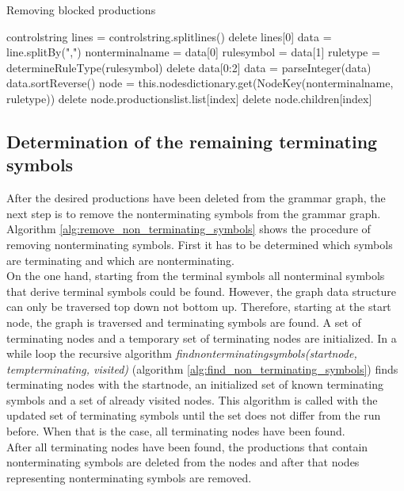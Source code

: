 \begin{algorithm}[H]
\caption{Removing blocked productions}
\begin{algorithmic}[1] 
\Require control\textunderscore string
\State lines = control\textunderscore string.splitlines()
\State delete lines[0]
	\State data = line.splitBy(",")
	\State nonterminal\textunderscore name = data[0] 
	\State rule\textunderscore symbol = data[1]
	\State rule\textunderscore type = determineRuleType(rule\textunderscore symbol)
	\State delete data[0:2]
	\State data = parseInteger(data)
	\State data.sortReverse()
	\State node = this.nodes\textunderscore dictionary.get(Node\textunderscore Key(nonterminal\textunderscore name, rule\textunderscore type))
		\State delete node.productions\textunderscore list.list[index]
		\State delete node.children[index]
	\EndFor
\EndFor
\end{algorithmic}
\label{alg:remove_blocked_productions}
\end{algorithm}

\subsection{Determination of the remaining terminating symbols}

After the desired productions have been deleted from the grammar graph, the next step is to remove the nonterminating symbols from the grammar graph. Algorithm \ref{alg:remove_non_terminating_symbols} shows the procedure of removing nonterminating symbols.
First it has to be determined which symbols are terminating and which are nonterminating. \\
On the one hand, starting from the terminal symbols all nonterminal symbols that derive terminal symbols could be found. However, the graph data structure can only be traversed top down not bottom up.
Therefore, starting at the start node, the graph is traversed and terminating symbols are found. 
A set of terminating nodes and a temporary set of terminating nodes are initialized.
In a while loop the recursive algorithm \textit{find\textunderscore non\textunderscore terminating\textunderscore symbols(start\textunderscore node, temp\textunderscore terminating, visited)} (algorithm \ref{alg:find_non_terminating_symbols}) finds terminating nodes with the start\textunderscore node, an initialized set of known terminating symbols and a set of already visited nodes.
This algorithm is called with the updated set of terminating symbols until the set does not differ from the run before.
When that is the case, all terminating nodes have been found.\\
After all terminating nodes have been found, the productions that contain nonterminating symbols are deleted from the nodes and after that nodes representing nonterminating symbols are removed.

